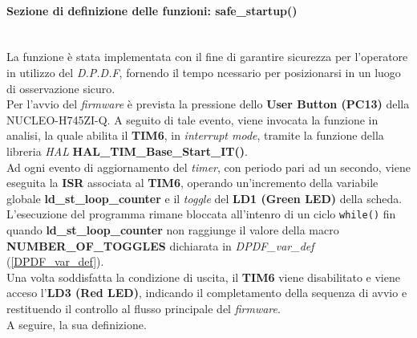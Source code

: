 \paragraph{Sezione di definizione delle funzioni: safe\_startup()}\mbox{}\\
La funzione è stata implementata con il fine di garantire sicurezza per l'operatore in utilizzo del \textit{D.P.D.F}, fornendo il tempo ncessario per posizionarsi in un luogo di osservazione sicuro.\\
Per l'avvio del \textit{firmware} è prevista la pressione dello \textbf{User Button (PC13)} della NUCLEO-H745ZI-Q. A seguito di tale evento, viene invocata la funzione in analisi, la quale abilita il \textbf{TIM6}, in \textit{interrupt mode}, tramite la funzione della libreria \textit{HAL} \textbf{HAL\_TIM\_Base\_Start\_IT()}.\\
Ad ogni evento di aggiornamento del \textit{timer}, con periodo pari ad un secondo, viene eseguita la \textbf{ISR} associata al \textbf{TIM6}, operando un'incremento della variabile globale \textbf{ld\_st\_loop\_counter} e il \textit{toggle} del \textbf{LD1 (Green LED)} della scheda.\\
L'esecuzione del programma rimane bloccata all'intenro di un ciclo \texttt{while()} fin quando \textbf{ld\_st\_loop\_counter} non raggiunge il valore della macro \textbf{NUMBER\_OF\_TOGGLES} dichiarata in \textit{DPDF\_var\_def} (\ref{DPDF_var_def}).\\
Una volta soddisfatta la condizione di uscita, il \textbf{TIM6} viene disabilitato e viene acceso l'\textbf{LD3 (Red LED)}, indicando il completamento della sequenza di avvio e restituendo il controllo al flusso principale del \textit{firmware}.\\
A seguire, la sua definizione.\\



